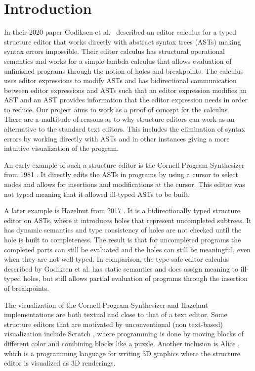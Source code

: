\section{Introduction}
\label{introduction}

In their 2020 paper Godiksen et al. \pepm~described an editor calculus for a
typed structure editor that works directly with abstract syntax trees (ASTs)
making syntax errors impossible. Their editor calculus has structural
operational semantics and works for a simple lambda calculus that allows
evaluation of unfinished programs through the notion of holes and breakpoints.
The calculus uses editor expressions to modify ASTs and has bidirectional
communication between editor expressions and ASTs such that an editor
expression modifies an AST and an AST provides information that the editor
expression needs in order to reduce. Our project aims to work as a proof of
concept for the calculus.\\

There are a multitude of reasons as to why structure editors can work as an
alternative to the standard text editors. This includes the elimination of
syntax errors by working directly with ASTs and in other instances giving a
more intuitive visualization of the program.

An early example of such a structure editor is the Cornell Program Synthesizer
from 1981 \cornell. It directly edits the ASTs in programs by using a cursor to
select nodes and allows for insertions and modifications at the cursor. This
editor was not typed meaning that it allowed ill-typed ASTs to be built.

A later example is Hazelnut from 2017 \hazel. It is a bidirectionally typed
structure editor on ASTs, where it introduces holes that represent uncompleted
subtrees. It has dynamic semantics and type consistency of holes are not
checked until the hole is built to completeness. The result is that for
uncompleted programs the completed parts can still be evaluated and the holes
can still be meaningful, even when they are not well-typed. In comparison, the
type-safe editor calculus described by Godiksen et al. has static semantics and
does assign meaning to ill-typed holes, but still allows partial evaluation of
programs through the insertion of breakpoints.

The visualization of the Cornell Program Synthesizer and Hazelnut
implementations are both textual and close to that of a text editor. Some
structure editors that are motivated by unconventional (non text-based)
visualization include Scratch \scratch, where programming is done by moving
blocks of different color and combining blocks like a puzzle. Another inclusion
is Alice \alice, which is a programming language for writing 3D graphics where
the structure editor is visualized as 3D renderings. \\


